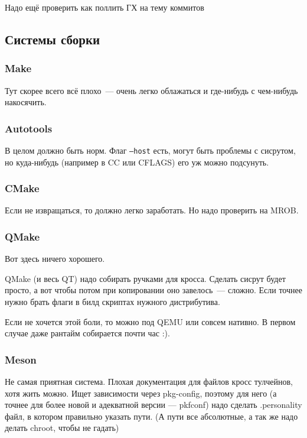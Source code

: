 Надо ещё проверить как поллить ГХ на тему коммитов

\subsection{Системы сборки}

\subsubsection{Make}
Тут скорее всего всё плохо~--- очень легко облажаться и где-нибудь с чем-нибудь накосячить.

\subsubsection{Autotools}
В целом должно быть норм.
Флаг \texttt{--host} есть, могут быть проблемы с сисрутом, но куда-нибудь (например в CC или CFLAGS) его уж можно подсунуть.

\subsubsection{CMake}
Если не извращаться, то должно легко заработать.
Но надо проверить на MROB.

\subsubsection{QMake}
Вот здесь ничего хорошего.

QMake (и весь QT) надо собирать ручками для кросса.
Сделать сисрут будет просто, а вот чтобы потом при копировании оно завелось~--- сложно.
Если точнее нужно брать флаги в билд скриптах нужного дистрибутива.

Если не хочется этой боли, то можно под QEMU или совсем нативно.
В первом случае даже рантайм собирается почти час :).

\subsubsection{Meson}
Не самая приятная система.
Плохая документация для файлов кросс тулчейнов, хотя жить можно.
Ищет зависимости через pkg-config, поэтому для него (а точнее для более новой и адекватной версии --- pkfconf) надо сделать .personality файл, в котором правильно указать пути.
(А пути все абсолютные, а так же надо делать chroot, чтобы не гадать)
